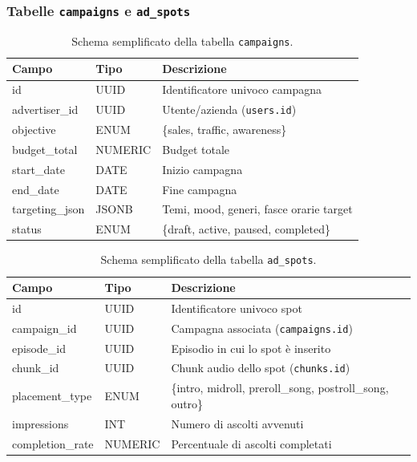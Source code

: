 \documentclass[11pt,a4paper]{article}
\begin{document}
\subsubsection*{Tabelle \texttt{campaigns} e \texttt{ad\_spots}}

\begin{table}[H]
    \centering
    \begin{tabular}{llp{7cm}}
        \toprule
        \textbf{Campo} & \textbf{Tipo} & \textbf{Descrizione} \\
        \midrule
        id & UUID & Identificatore univoco campagna \\
        advertiser\_id & UUID & Utente/azienda (\texttt{users.id}) \\
        objective & ENUM & \{sales, traffic, awareness\} \\
        budget\_total & NUMERIC & Budget totale \\
        start\_date & DATE & Inizio campagna \\
        end\_date & DATE & Fine campagna \\
        targeting\_json & JSONB & Temi, mood, generi, fasce orarie target \\
        status & ENUM & \{draft, active, paused, completed\} \\
        \bottomrule
    \end{tabular}
    \caption{Schema semplificato della tabella \texttt{campaigns}.}
\end{table}

\begin{table}[H]
    \centering
    \begin{tabular}{llp{7cm}}
        \toprule
        \textbf{Campo} & \textbf{Tipo} & \textbf{Descrizione} \\
        \midrule
        id & UUID & Identificatore univoco spot \\
        campaign\_id & UUID & Campagna associata (\texttt{campaigns.id}) \\
        episode\_id & UUID & Episodio in cui lo spot è inserito \\
        chunk\_id & UUID & Chunk audio dello spot (\texttt{chunks.id}) \\
        placement\_type & ENUM & \{intro, midroll, preroll\_song, postroll\_song, outro\} \\
        impressions & INT & Numero di ascolti avvenuti \\
        completion\_rate & NUMERIC & Percentuale di ascolti completati \\
        \bottomrule
    \end{tabular}
    \caption{Schema semplificato della tabella \texttt{ad\_spots}.}
\end{table}
\end{document}
